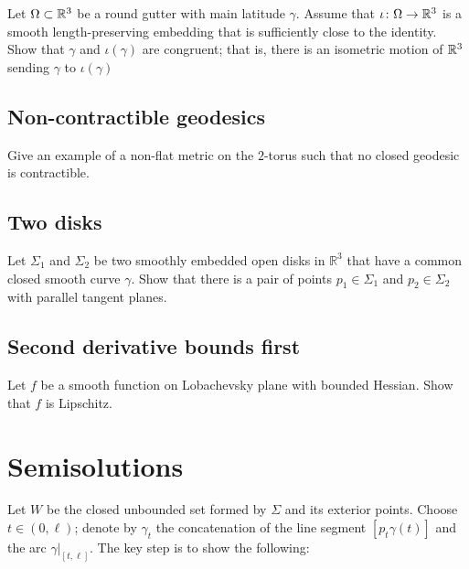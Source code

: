 \begin{pr}
Let $\Omega\subset \mathbb{R}^3$ be a round gutter with main latitude $\gamma$. 
Assume that $\iota\:\Omega\z\to\RR^3$ 
is a smooth length-preserving embedding that is sufficiently close to the identity.
Show that $\gamma$ and $\iota(\gamma)$ are congruent;
that is, there is an isometric motion of $\mathbb{R}^3$ sending $\gamma$ to $\iota(\gamma)$
\end{pr}



\subsection*{Non-contractible geodesics}
\label{torus}

\begin{pr}
Give an example of a non-flat metric 
on the $2$-torus such that no closed geodesic is contractible.
\end{pr}


\subsection*{Two disks}
\label{Two disks}

\begin{pr}
Let $\Sigma_1$ and $\Sigma_2$ be two smoothly embedded open disks in $\mathbb R^3$ 
that have a common closed smooth curve $\gamma$.
Show that there is a pair of points  $p_1\in \Sigma_1$ and $p_2\in \Sigma_2$ with parallel tangent planes.
\end{pr}

\subsection*{Second derivative bounds first}
\label{Second derivative bounds first}

\begin{pr}
Let $f$ be a smooth function on Lobachevsky plane with bounded Hessian.
Show that $f$ is Lipschitz.
\end{pr}


\section*{Semisolutions}
Let $W$ be the closed unbounded set formed by $\Sigma$ and its exterior points.
Choose $t\in (0,\ell)$;
denote by $\gamma_t$ the concatenation of the line segment $[p_t\gamma(t)]$ and the arc $\gamma|_{[t,\ell]}$.
The key step is to show the following:

